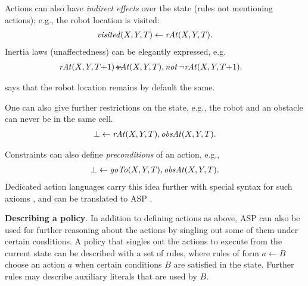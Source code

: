 \documentclass{new_tlp}
\newcommand{\nqbls}{\vspace*{-0.25\baselineskip}}
\newcommand{\leanparagraph}[1]{\smallskip\noindent\textbf{#1}. }
\def\mi#1{\mathit{#1\/}}
\def\ba{\begin{array}}
\def\ea{\end{array}}
\def\beq{\begin{equation}}
\def\eeq#1{\label{#1}\end{equation}}
\begin{document}
\noindent Actions can also have \emph{indirect effects} over the state (rules not
mentioning actions); e.g., %
the robot location  is visited:
\nqbls
\beq \ba l
\mi{visited}(X,Y,T) \leftarrow \mi{rAt}(X,Y,T).
\ea \eeq {eq:indirect}
\noindent Inertia laws (unaffectedness) can be elegantly expressed, e.g.\
\begin{eqnarray}
 \mi{rAt}(X,Y,T{+}1) \! \leftarrow \!\!\!\!\! & \mi{rAt}(X,Y,T),  \mi{not}\, \neg \mi{rAt}(X,Y,T{+}1). \nonumber
\end{eqnarray}

\noindent says that the robot location remains by default the same.

One can also give further restrictions on the state, e.g., the robot and
an obstacle can never be
in the same %
cell.
\nqbls
\beq \ba l
\bot \leftarrow \mi{rAt}(X,Y,T), \mi{obsAt}(X,Y,T).
\ea \eeq {eq:obs}

\noindent Constraints can also define \emph{preconditions} of an action, e.g.,
\nqbls
\beq \ba l
\bot \leftarrow \mi{goTo}(X,Y,T), \mi{obsAt}(X,Y,T).
\ea \eeq {eq:precond}
%
Dedicated action languages carry this idea further with special 
syntax for such axioms \cite{gelfondaction98}, and can be translated to ASP \cite{giunchiglia2004nct}.

\leanparagraph{Describing a policy} In addition to defining actions as above, ASP can also be used for further reasoning about the actions by singling out some of them under certain conditions. A policy that singles out the actions to execute from the current state can be described with a set
of rules,
where rules of
form $a {\leftarrow} B$ choose an action $a$ when certain
conditions $B$ are satisfied in the state. 
Further rules may 
describe auxiliary literals that are used by $B$. 
\end{document}
